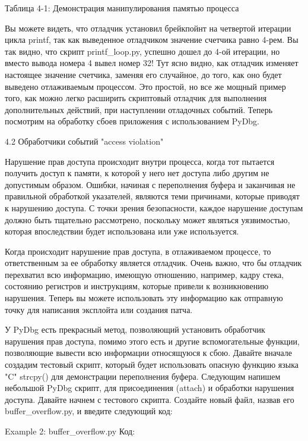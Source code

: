 \documentclass[12pt]{book}
\begin{document}
Таблица 4-1: Демонстрация манипулирования памятью процесса

Вы можете видеть, что отладчик установил брейкпойнт на четвертой итерации цикла printf, так как выведенное отладчиком значение счетчика равно 4-рем. Вы так видно, что скрипт printf\_loop.py, успешно дошел до 4-ой итерации, но вместо вывода номера 4 вывел номер 32! Тут ясно видно, как отладчик изменяет настоящее значение счетчика, заменяя его случайное, до того, как оно будет выведено отлаживаемым процессом. Это простой, но все же мощный пример того, как можно легко расширить скриптовый отладчик для выполнения дополнительных действий, при наступлении отладочных событий. Теперь посмотрим на обработку сбоев приложения с использованием PyDbg.


4.2 Обработчики событий "access violation"

Нарушение прав доступа происходит внутри процесса, когда тот пытается получить доступ к памяти, к которой у него нет доступа либо другим не допустимым образом. Ошибки, начиная с переполнения буфера и заканчивая не правильной обработкой указателей, являются теми причинами, которые приводят к нарушению доступа. С точки зрения безопасности, каждое нарушение доступам должно быть тщательно рассмотрено, поскольку может являться уязвимостью, которая впоследствии будет использована или уже используется. 

Когда происходит нарушение прав доступа, в отлаживаемом процессе, то ответственным за ее обработку является отладчик. Очень важно, что бы отладчик перехватил всю информацию, имеющую отношению, например, кадру стека, состоянию регистров и инструкциям, которые привели к возникновению нарушения. Теперь вы можете использовать эту информацию как отправную точку для написания эксплойта или создания патча.

У PyDbg есть прекрасный метод, позволяющий установить обработчик нарушения прав доступа, помимо этого есть и другие вспомогательные функции, позволяющие вывести всю информации относящуюся к сбою. Давайте вначале создадим тестовый скрипт, который будет использовать опасную функцию языка "C" strcpy() для демонстрации переполнения буфера. Следующим напишем небольшой PyDbg скрипт, для присоединения (attach) и обработки нарушения доступа. Давайте начнем с тестового скрипта. Создайте новый файл, назвав его buffer\_overflow.py, и введите следующий код:

Example 2: buffer\_overflow.py
Код:

\end{document}
